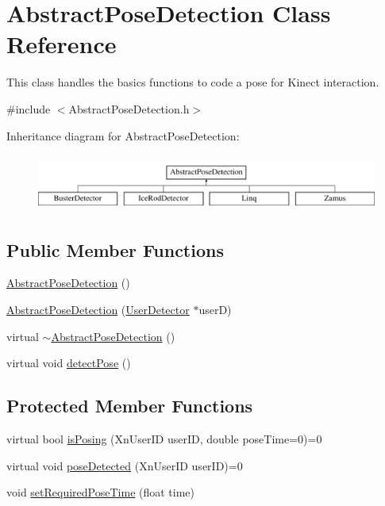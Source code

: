 \hypertarget{classAbstractPoseDetection}{
\section{AbstractPoseDetection Class Reference}
\label{classAbstractPoseDetection}
}


This class handles the basics functions to code a pose for Kinect interaction.  




{\ttfamily \#include $<$AbstractPoseDetection.h$>$}

Inheritance diagram for AbstractPoseDetection:\begin{figure}[H]
\begin{center}
\leavevmode
\includegraphics[height=1.89189cm]{classAbstractPoseDetection}
\end{center}
\end{figure}
\subsection*{Public Member Functions}
\begin{DoxyCompactItemize}
\item 
\hyperlink{classAbstractPoseDetection_ab75546d06563322c8c8f3ffc04375d02}{AbstractPoseDetection} ()
\item 
\hyperlink{classAbstractPoseDetection_a255ffffe8620b1c83b168f97bbd57fdd}{AbstractPoseDetection} (\hyperlink{classUserDetector}{UserDetector} $\ast$userD)
\item 
virtual \hyperlink{classAbstractPoseDetection_a017e98779fcc1340c69ef52911966ac3}{$\sim$AbstractPoseDetection} ()
\item 
virtual void \hyperlink{classAbstractPoseDetection_a2c80bcd1d7efd1f7ad7c0f6e51ab8af4}{detectPose} ()
\end{DoxyCompactItemize}
\subsection*{Protected Member Functions}
\begin{DoxyCompactItemize}
\item 
virtual bool \hyperlink{classAbstractPoseDetection_ac3343980a1c6b822743b43c4274275e9}{isPosing} (XnUserID userID, double poseTime=0)=0
\item 
virtual void \hyperlink{classAbstractPoseDetection_a7351e9ac500669934ff823aaf0767076}{poseDetected} (XnUserID userID)=0
\item 
void \hyperlink{classAbstractPoseDetection_a6331815704045d8370972f5770bd8d5f}{setRequiredPoseTime} (float time)
\end{DoxyCompactItemize}
